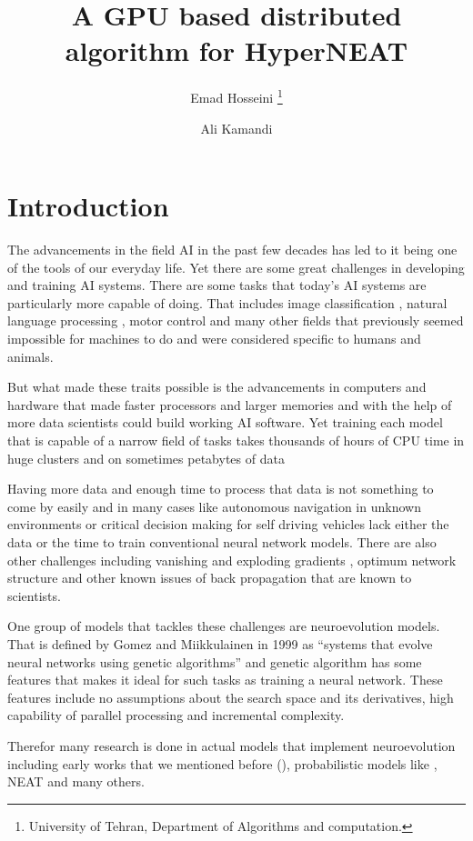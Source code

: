 \documentclass[twocolumn]{article}
\title{A GPU based distributed algorithm for HyperNEAT}
\author{Emad Hosseini \thanks{University of Tehran, 
Department of Algorithms and computation.} 
\and Ali Kamandi}
\begin{document}
\maketitle


\section{Introduction}
The advancements in the field AI in the past few decades has led to it being one of the tools of our everyday life. Yet there are some great challenges in developing and training AI systems. There are some tasks that today's AI systems are particularly more capable of doing. That includes image classification \cite{DeepImageClassificationReview}, natural language processing \cite{NLPReview}, motor control \cite{DeepRlforMotorControl} and many other fields that previously seemed impossible for machines to do and were considered specific to humans and animals.

But what made these traits possible is the advancements in computers and hardware that made faster processors and larger memories and with the help of more data scientists could build working AI software. Yet training each model that is capable of a narrow field of tasks takes thousands of hours of CPU time in huge clusters and on sometimes petabytes of data \cite{NEAT-Hardware-IEEE}

Having more data and enough time to process that data is not something to come by easily and in many cases like autonomous navigation in unknown environments or critical decision making for self driving vehicles lack either the data or the time to train conventional neural network models. There are also other challenges including vanishing and exploding gradients \cite{ExplodingAndVanishingGradients}, optimum network structure and other known issues of back propagation that are known to scientists. 

One group of models that tackles these challenges are neuroevolution models. That is defined by Gomez and  Miikkulainen in 1999 as ``systems that evolve neural networks using genetic algorithms'' \cite{NEDefenitionMiikkulainen} and genetic algorithm has some features that makes it ideal for such tasks as training a neural network. These features include no assumptions about the search space and its derivatives, high capability of parallel processing and incremental complexity.

Therefor many research is done in actual models that implement neuroevolution including early works that we mentioned before (\cite{NEDefenitionMiikkulainen}), probabilistic models like \cite{OtherNESample1}, NEAT \cite{originalNEAT} and many others.
\end{document}
